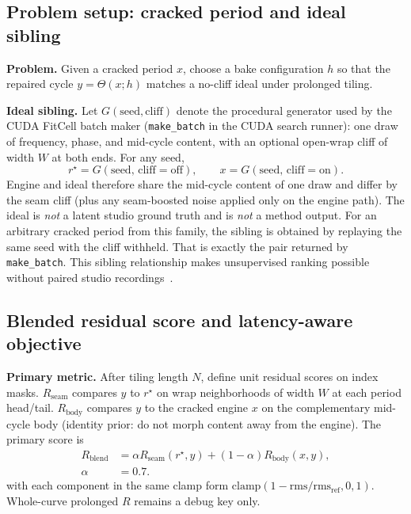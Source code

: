 \subsection{Problem setup: cracked period and ideal sibling}
\label{sec:ideal-tile}

\textbf{Problem.} Given a cracked period $x$, choose a bake configuration $h$ so that the repaired cycle $y=\Theta(x;h)$ matches a no-cliff ideal under prolonged tiling.

\textbf{Ideal sibling.}
Let $G(\mathrm{seed},\mathrm{cliff})$ denote the procedural generator used by the CUDA FitCell batch maker
(\texttt{make\_batch} in the CUDA search runner): one draw of frequency, phase, and mid-cycle content, with an optional open-wrap cliff of width $W$ at both ends.
For any seed,
\begin{equation}
\label{eq:G-siblings}
r^{\star}=G(\mathrm{seed},\,\mathrm{cliff{=}off}),\qquad
x=G(\mathrm{seed},\,\mathrm{cliff{=}on}).
\end{equation}
Engine and ideal therefore share the mid-cycle content of one draw and differ by the seam cliff (plus any seam-boosted noise applied only on the engine path).
The ideal is \emph{not} a latent studio ground truth and is \emph{not} a method output.
For an arbitrary cracked period from this family, the sibling is obtained by replaying the same seed with the cliff withheld.
That is exactly the pair returned by \texttt{make\_batch}.
This sibling relationship makes unsupervised ranking possible without paired studio recordings~\cite{lehtinen2018,kashyap2021n2n}.

\subsection{Blended residual score and latency-aware objective}
\label{sec:residual-score}

\textbf{Primary metric.}
After tiling length $N$, define unit residual scores on index masks.
$R_{\mathrm{seam}}$ compares $y$ to $r^{\star}$ on wrap neighborhoods of width $W$ at each period head/tail.
$R_{\mathrm{body}}$ compares $y$ to the cracked engine $x$ on the complementary mid-cycle body (identity prior: do not morph content away from the engine).
The primary score is
\begin{equation}
\label{eq:R-blend}
\begin{aligned}
R_{\mathrm{blend}}
&=\alpha R_{\mathrm{seam}}(r^{\star},y)+(1-\alpha)R_{\mathrm{body}}(x,y),\\
\alpha&=0.7.
\end{aligned}
\end{equation}
with each component in the same clamp form
$\mathrm{clamp}(1-\mathrm{rms}/\mathrm{rms}_{\mathrm{ref}},0,1)$.
Whole-curve prolonged $R$ remains a debug key only.

